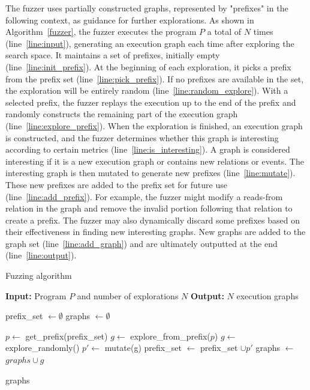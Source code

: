 The fuzzer uses partially constructed graphs, represented by "prefixes" in the following context, as guidance for further explorations. As shown in Algorithm~\ref{fuzzer}, the fuzzer executes the program $P$ a total of $N$ times (line~\ref{line:input}), generating an execution graph each time after exploring the search space. It maintains a set of prefixes, initially empty (line~\ref{line:init_prefix}). At the beginning of each exploration, it picks a prefix from the prefix set (line~\ref{line:pick_prefix}). If no prefixes are available in the set, the exploration will be entirely random (line~\ref{line:random_explore}). With a selected prefix, the fuzzer replays the execution up to the end of the prefix and randomly constructs the remaining part of the execution graph (line~\ref{line:explore_prefix}). When the exploration is finished, an execution graph is constructed, and the fuzzer determines whether this graph is interesting according to certain metrics (line~\ref{line:is_interesting}). A graph is considered interesting if it is a new execution graph or contains new relations or events. The interesting graph is then mutated to generate new prefixes (line~\ref{line:mutate}). These new prefixes are added to the prefix set for future use (line~\ref{line:add_prefix}). For example, the fuzzer might modify a reads-from relation in the graph and remove the invalid portion following that relation to create a prefix. The fuzzer may also dynamically discard some prefixes based on their effectiveness in finding new interesting graphs. New graphs are added to the graph set (line~\ref{line:add_graph}) and are ultimately outputted at the end (line~\ref{line:output}). 



\begin{algorithm}
    \caption{Fuzzing algorithm}
    \label{fuzzer}
    \begin{algorithmic}[1]
    \STATE \textbf{Input:} Program $P$ and number of explorations $N$ \label{line:input}
    \STATE \textbf{Output:} $N$ execution graphs
    
    \STATE prefix\_set $\leftarrow \emptyset$ \label{line:init_prefix}
    \STATE graphs $\leftarrow \emptyset$ 
    
            \STATE $p \leftarrow$ get\_prefix(prefix\_set) \label{line:pick_prefix}
            \STATE $g \leftarrow $ explore\_from\_prefix($p$) \label{line:explore_prefix}
        \ELSE 
            \STATE $g \leftarrow $ explore\_randomly() \label{line:random_explore}
        \ENDIF 
         \label{line:is_interesting}
            \STATE $p' \leftarrow$ mutate(g) \label{line:mutate}
            \STATE prefix\_set $\leftarrow$ prefix\_set $\cup p'$      \label{line:add_prefix}  
        \ENDIF
        \STATE graphs $\leftarrow$ $graphs \cup g$      \label{line:add_graph}
    \ENDFOR
    
    \RETURN graphs      \label{line:output}
    \end{algorithmic}
\end{algorithm}

